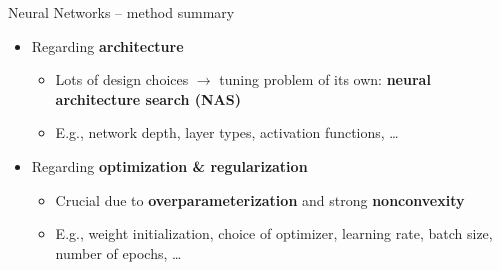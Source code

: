 \begin{frame}{Neural Networks -- method summary}
\begin{itemize}
  \item Regarding \textbf{architecture}
  \begin{itemize}
    \item Lots of design choices $\rightarrow$ tuning problem of its own: 
    \textbf{neural architecture search (NAS)}
    \item E.g., network depth, layer types, activation functions, \dots
  \end{itemize}
  \item Regarding \textbf{optimization \& regularization}
  \begin{itemize}
    \item Crucial due to \textbf{overparameterization} and strong 
    \textbf{nonconvexity} 
    \item E.g., weight initialization, choice of optimizer, learning rate, 
    batch size, number of epochs, \dots
  \end{itemize}
\end{itemize}

\medskip


\end{frame}


